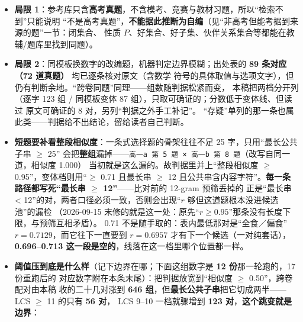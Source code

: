 \documentclass[a4paper,11pt]{article}
\begin{document}
\begin{itemize}
{  检测不能只看一处最长连续子串，还得看``数字/字母之外的骨架''与``概念名''这两路。}
\item
  \textbf{局限 1}：参考库只含\textbf{高考真题}，不含模考、竞赛与教材习题，所以``检索不到''只能说明
  ``不是高考真题''，\textbf{不能据此推断为自编}（见``非高考但能考据到来源的题''一节：闭集合、
  性质 \(P\)、好集合、好子集、伙伴关系集合等都能在教辅/题库里找到同题）。
\item
  \textbf{局限 2}：同模板换数字的改编题，机器判定边界模糊；出处表的 \textbf{89 条对应（72 道真题）} 均已逐条核对原文（含数学
  符号的具体取值与选项文字），但仍有判断余地。``跨卷同题''同理------组数随判据松紧而变，
  本稿把两档分开列（逐字 123 组 / 同模板变体 87 组），只取可确证的；分数低于变体线、但读过
  原文可确证的 8 对，另列``判据之外手工补记''。
  ``存疑''单列的那一条也属此类------判据给不出结论，留给读者自己判断。
\item
  \textbf{短题要补看整段相似度}：一条式选择题的骨架往往不足 25 字，只用``最长公共子串 $\geqslant$ 25''
  会把\textbf{整组}漏掉------\texttt{高一a\ 第\ 5\ 题\ ×\ 高一b\ 第\ 8\ 题}（改写自同一道，相似度 1.000）
  当初就是这么漏的。故判据里并上``整段相似度 $\geqslant$ 0.95''，变体档则用``$\geqslant$ 0.71 且最长串 $\geqslant$ 12
  且公共串含内容字符''。\textbf{每一条路径都写死``最长串 $\geqslant$ 12''}------比对前的 12-gram 预筛丢掉的
  正是``最长串 \textless{} 12''的对，两者口径必须一致，否则会出现``\(r\) 够但这道题根本没进候选池''的漏检
  （2026-09-15 末修的就是这一处：原先``\(r\ge0.95\)''那条没有长度下限，与预筛互相矛盾）。
  0.71 不是随手取的：表内最低那对是``全食／偏食''\(r=0.7129\)，而它往下一直要到 \(r=0.6957\)
  才有下一个候选（一对纯套话），\textbf{0.696--0.713 这一段是空的}，线落在这一档里哪个位置都一样。
\item
  \textbf{阈值压到底是什么样}（记下边界在哪；下面这组数字是 \textbf{12 份}那一轮跑的，17 份重跑后的
  对应数字附在本条末尾）：把判据放宽到``相似度 $\geqslant$ 0.50''，跨卷配对由本稿
  收的二十几对涨到 \textbf{646 组}，但\textbf{最长公共子串}把它切成两半------LCS $\geqslant$ 11 的只有 \textbf{56 对}，
  LCS 9--10 一档就骤增到 \textbf{123 对}，\textbf{这个跳变就是边界}：


\end{itemize}
\end{document}
